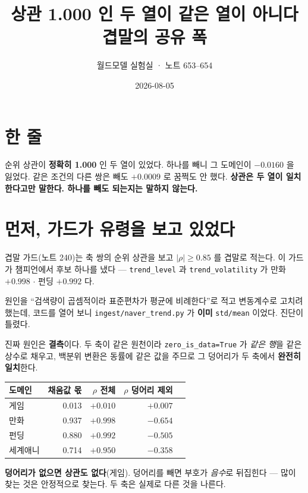 \documentclass[10pt,a4paper]{article}
\title{\bfseries 상관 1.000 인 두 열이 같은 열이 아니다\\[2pt]
\large 겹말의 공유 폭}
\author{월드모델 실험실 · 노트 653--654}
\date{2026-08-05}
\begin{document}
\maketitle

\section{한 줄}

순위 상관이 \textbf{정확히 1.000} 인 두 열이 있었다. 하나를 빼니 그 도메인이
$-0.0160$ 을 잃었다. 같은 조건의 다른 쌍은 빼도 $+0.0009$ 로 꿈쩍도 안 했다.
\textbf{상관은 두 열이 일치한다고만 말한다. 하나를 빼도 되는지는 말하지 않는다.}

\section{먼저, 가드가 유령을 보고 있었다}

겹말 가드(노트 240)는 축 쌍의 순위 상관을 보고 $|\rho| \ge 0.85$ 를 겹말로
적는다. 이 가드가 챔피언에서 후보 하나를 냈다 --- \verb|trend_level| 과
\verb|trend_volatility| 가 만화 $+0.998$ $\cdot$ 펀딩 $+0.992$ 다.

원인을 ``검색량이 곱셈적이라 표준편차가 평균에 비례한다''로 적고 변동계수로
고치려 했는데, 코드를 열어 보니 \verb|ingest/naver_trend.py| 가 \textbf{이미}
\verb|std/mean| 이었다. 진단이 틀렸다.

진짜 원인은 \textbf{결측}이다. 두 축이 같은 원천이라 \verb|zero_is_data=True|
가 \emph{같은 행}을 같은 상수로 채우고, 백분위 변환은 동률에 같은 값을 주므로
그 덩어리가 두 축에서 \textbf{완전히 일치}한다.

\begin{center}\small
\begin{tabular}{lrrrr}\toprule
도메인 & 채움값 몫 & $\rho$ 전체 & $\rho$ 덩어리 제외 \\ \midrule
게임 & 0.013 & $+0.010$ & $+0.007$ \\
만화 & 0.937 & $+0.998$ & $\mathbf{-0.654}$ \\
펀딩 & 0.880 & $+0.992$ & $\mathbf{-0.505}$ \\
세계애니 & 0.714 & $+0.950$ & $-0.358$ \\ \bottomrule
\end{tabular}\end{center}

\textbf{덩어리가 없으면 상관도 없다}(게임). 덩어리를 빼면 부호가 \emph{음수}로
뒤집힌다 --- 많이 찾는 것은 안정적으로 찾는다. 두 축은 실제로 다른 것을 나른다.
\end{document}
